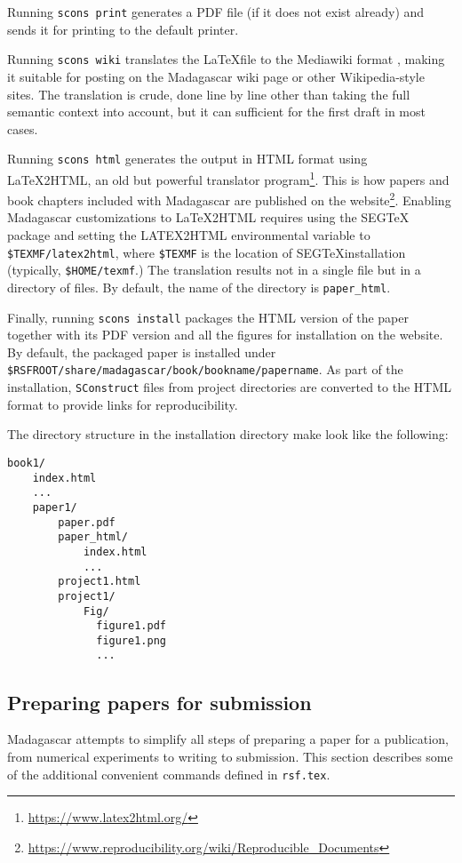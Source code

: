 {{Running \texttt{scons print} generates a PDF file (if it does not exist
already) and sends it for printing to the default printer.

Running \texttt{scons wiki} translates the \LaTeX file to the
Mediawiki format \cite[]{barrett2008mediawiki}, making it suitable for posting on the Madagascar
wiki page or other Wikipedia-style sites. The translation is crude,
done line by line other than taking the full semantic context into
account, but it can sufficient for the first draft in most cases.

Running \texttt{scons html} generates the output in HTML format using
\LaTeX2HTML, an old but powerful translator
program\footnote{\url{https://www.latex2html.org/}}. This is how
papers and book chapters included with Madagascar are published on the
website\footnote{\url{https://www.reproducibility.org/wiki/Reproducible_Documents}}. Enabling
Madagascar customizations to \LaTeX2HTML requires using the SEG\TeX
package and setting the LATEX2HTML environmental variable to
\texttt{\$TEXMF/latex2html}, where \texttt{\$TEXMF} is the location of
SEG\TeX installation (typically, \texttt{\$HOME/texmf}.) The
translation results not in a single file but in a directory of
files. By default, the name of the directory is \texttt{paper_html}.

Finally, running \texttt{scons install} packages the HTML version of
the paper together with its PDF version and all the figures for
installation on the website. By default, the packaged paper is
installed under
\texttt{\$RSFROOT/share/madagascar/book/bookname/papername}. As part
of the installation, \texttt{SConstruct} files from project
directories are converted to the HTML format to provide links for
reproducibility.

The directory structure in the installation directory make look like
the following:
\begin{verbatim}
book1/
    index.html
    ...
    paper1/
        paper.pdf
        paper_html/
            index.html
            ...
        project1.html
        project1/
            Fig/
              figure1.pdf
              figure1.png
              ...
\end{verbatim}

\subsection{Preparing papers for submission}

Madagascar attempts to simplify all steps of preparing a paper for a
publication, from numerical experiments to writing to submission. This
section describes some of the additional convenient commands defined
in \texttt{rsf.tex}.

}}

